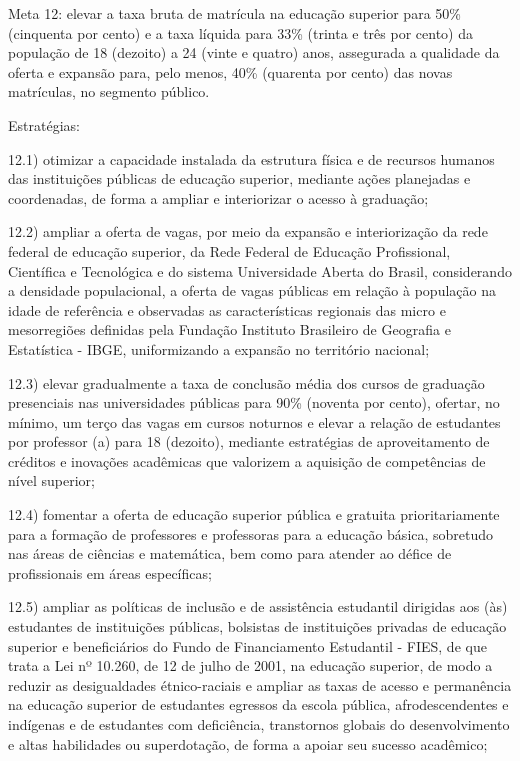 \documentclass[
]{book}
\begin{document}
Meta 12: elevar a taxa bruta de matrícula na educação superior para 50\% (cinquenta por cento) e a taxa líquida para 33\% (trinta e três por cento) da população de 18 (dezoito) a 24 (vinte e quatro) anos, assegurada a qualidade da oferta e expansão para, pelo menos, 40\% (quarenta por cento) das novas matrículas, no segmento público.

Estratégias:

12.1) otimizar a capacidade instalada da estrutura física e de recursos humanos das instituições públicas de educação superior, mediante ações planejadas e coordenadas, de forma a ampliar e interiorizar o acesso à graduação;

12.2) ampliar a oferta de vagas, por meio da expansão e interiorização da rede federal de educação superior, da Rede Federal de Educação Profissional, Científica e Tecnológica e do sistema Universidade Aberta do Brasil, considerando a densidade populacional, a oferta de vagas públicas em relação à população na idade de referência e observadas as características regionais das micro e mesorregiões definidas pela Fundação Instituto Brasileiro de Geografia e Estatística - IBGE, uniformizando a expansão no território nacional;

12.3) elevar gradualmente a taxa de conclusão média dos cursos de graduação presenciais nas universidades públicas para 90\% (noventa por cento), ofertar, no mínimo, um terço das vagas em cursos noturnos e elevar a relação de estudantes por professor (a) para 18 (dezoito), mediante estratégias de aproveitamento de créditos e inovações acadêmicas que valorizem a aquisição de competências de nível superior;

12.4) fomentar a oferta de educação superior pública e gratuita prioritariamente para a formação de professores e professoras para a educação básica, sobretudo nas áreas de ciências e matemática, bem como para atender ao défice de profissionais em áreas específicas;

12.5) ampliar as políticas de inclusão e de assistência estudantil dirigidas aos (às) estudantes de instituições públicas, bolsistas de instituições privadas de educação superior e beneficiários do Fundo de Financiamento Estudantil - FIES, de que trata a Lei nº 10.260, de 12 de julho de 2001, na educação superior, de modo a reduzir as desigualdades étnico-raciais e ampliar as taxas de acesso e permanência na educação superior de estudantes egressos da escola pública, afrodescendentes e indígenas e de estudantes com deficiência, transtornos globais do desenvolvimento e altas habilidades ou superdotação, de forma a apoiar seu sucesso acadêmico;
\end{document}
